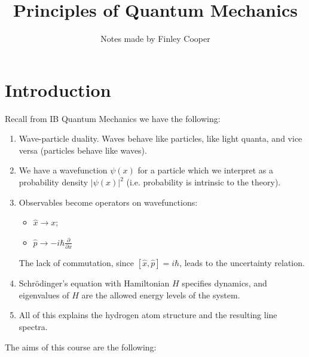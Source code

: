 \documentclass{article}
\title{Principles of Quantum Mechanics}
\author{Notes made by Finley Cooper}
\begin{document}
\maketitle

\newpage

\tableofcontents

\newpage

\section{Introduction}

Recall from IB Quantum Mechanics we have the following:

\begin{enumerate}

    \item Wave-particle duality. Waves behave like particles, like light quanta, and vice versa (particles behave like waves).

    \item We have a wavefunction $\psi(x)$ for a particle which we interpret as a probability density $|\psi(x)|^2$ (i.e. probability is intrinsic to the theory).

    \item Observables become operators on wavefunctions:

        \begin{itemize}
            \item $\hat{x} \to x$;
            \item $\hat{p} \to -i\hbar \frac{\partial}{\partial x}$
        \end{itemize}

        The lack of commutation, since $[\hat{x},\hat{p}] = i\hbar$, leads to the uncertainty relation.

    \item Schrödinger's equation with Hamiltonian $H$ specifies dynamics, and eigenvalues of $H$ are the allowed energy levels of the system.

    \item All of this explains the hydrogen atom structure and the resulting line spectra.

\end{enumerate}

The aims of this course are the following:
\end{document}
